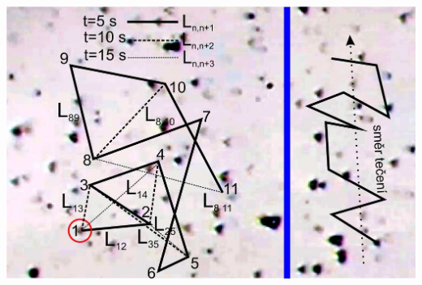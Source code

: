 \documentclass[a4paper,11pt]{article}
\begin{document}
    \begin{minipage}[t]{0.5\textwidth} 
        \vspace{0pt}
        \centering
        \includegraphics[scale=0.9]{Příklad záznamu chaotického pohybu brownovské částice}
        \captionsetup{justification=centering, font=footnotesize}
        \label{fig:Příklad záznamu chaotického pohybu brownovské částice na průsvitném papíře přiloženém přes obraz z mikroskopu, v případě bez tečení preparátu (vlevo) a při tečení (vpravo). V záznamu pohybu částice vlevo jsou zaneseny trajektorie částice složené z vektorů posunutí při záznamu po časových intervalech t = 5 s (plná čára), 10 s (přerušovaná čára) a 15 s (tečkovaná čára).}
        \vspace{10pt}
        \raggedright

\end{minipage}
\end{document}
